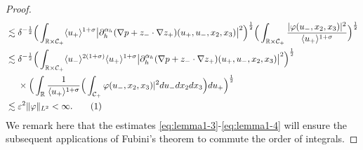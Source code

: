 \documentclass[10pt,reqno]{amsart}
\numberwithin{equation}{section}
\begin{document}
\begin{proof}
\begin{align*}
	&\lesssim
	\delta^{-\frac{1}{2}}\Big(\int_{\mathbb{R}\times \mathcal{C}_+}\langle  u_+\rangle^{1+\sigma}\big|\partial_h^{\alpha_h}(\nabla p+z_{-}\cdot\nabla z_{+}) 
	(u_+,u_-,x_2,x_3)\big|^2 \Big)^{\frac{1}{2}}
	\Big(\int_{\mathbb{R}\times \mathcal{C}_+}\frac{|\varphi(u_-,x_2,x_3)|^2}{\langle u_+\rangle^{1+\sigma}}\Big)^{\frac{1}{2}}\\
	&\lesssim\delta^{-\frac{1}{2}}\Big(\int_{\mathbb{R}\times \mathcal{C}_+}\langle u_-\rangle^{2(1+\sigma)}\langle u_+\rangle^{1+\sigma}\big|\partial_h^{\alpha_h}(\nabla p+z_{-}\cdot\nabla z_{+}) (u_+,u_-,x_2,x_3)\big|^2\Big)^{\frac{1}{2}}\\
	&\ \ \ \ \times \Big(\int_{\mathbb{R}}\frac{1}{\langle u_+\rangle^{1+\sigma}}\Big(\int_{\mathcal{C}_+} \varphi(u_-,x_2,x_3)|^2  du_-dx_2dx_3 \Big)du_+\Big)^{\frac{1}{2}}\\
	&\lesssim\varepsilon^2\|\varphi\|_{L^2}<\infty.\stepcounter{equation}\tag{\theequation}\label{eq:lemma1-4}
\end{align*}
We remark here that the estimates \eqref{eq:lemma1-3}-\eqref{eq:lemma1-4} will ensure the subsequent applications of Fubini's theorem to commute the order of integrals. 
 

\end{proof}
\end{document}
